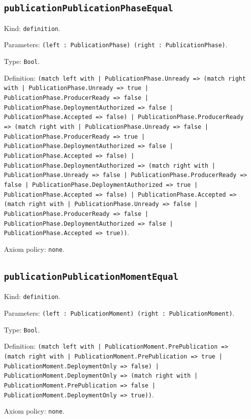 \documentclass[11pt]{article}
\begin{document}
\subsection*{\texttt{publicationPublicationPhaseEqual}}
\noindent Kind: \texttt{definition}.\par
\noindent Parameters: \texttt{(left : PublicationPhase) (right : PublicationPhase)}.\par
\noindent Type: \texttt{Bool}.\par
\noindent Definition: \texttt{(match left with | PublicationPhase.Unready => (match right with | PublicationPhase.Unready => true | PublicationPhase.ProducerReady => false | PublicationPhase.DeploymentAuthorized => false | PublicationPhase.Accepted => false) | PublicationPhase.ProducerReady => (match right with | PublicationPhase.Unready => false | PublicationPhase.ProducerReady => true | PublicationPhase.DeploymentAuthorized => false | PublicationPhase.Accepted => false) | PublicationPhase.DeploymentAuthorized => (match right with | PublicationPhase.Unready => false | PublicationPhase.ProducerReady => false | PublicationPhase.DeploymentAuthorized => true | PublicationPhase.Accepted => false) | PublicationPhase.Accepted => (match right with | PublicationPhase.Unready => false | PublicationPhase.ProducerReady => false | PublicationPhase.DeploymentAuthorized => false | PublicationPhase.Accepted => true))}.\par
\noindent Axiom policy: \texttt{none}.\par
\subsection*{\texttt{publicationPublicationMomentEqual}}
\noindent Kind: \texttt{definition}.\par
\noindent Parameters: \texttt{(left : PublicationMoment) (right : PublicationMoment)}.\par
\noindent Type: \texttt{Bool}.\par
\noindent Definition: \texttt{(match left with | PublicationMoment.PrePublication => (match right with | PublicationMoment.PrePublication => true | PublicationMoment.DeploymentOnly => false) | PublicationMoment.DeploymentOnly => (match right with | PublicationMoment.PrePublication => false | PublicationMoment.DeploymentOnly => true))}.\par
\noindent Axiom policy: \texttt{none}.\par
\end{document}
